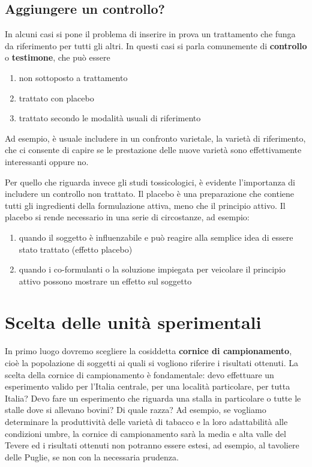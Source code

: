 \documentclass[a4paper,12pt,oneside]{book}
\providecommand{\tightlist}{%
  \setlength{\itemsep}{0pt}\setlength{\parskip}{0pt}}
\begin{document}
\hypertarget{aggiungere-un-controllo}{%
\subsection{Aggiungere un controllo?}\label{aggiungere-un-controllo}}

In alcuni casi si pone il problema di inserire in prova un trattamento che funga da riferimento per tutti gli altri. In questi casi si parla comunemente di \textbf{controllo} o \textbf{testimone}, che può essere

\begin{enumerate}
\def\labelenumi{\arabic{enumi}.}
\tightlist
\item
  non sottoposto a trattamento
\item
  trattato con placebo
\item
  trattato secondo le modalità usuali di riferimento
\end{enumerate}

Ad esempio, è usuale includere in un confronto varietale, la varietà di riferimento, che ci consente di capire se le prestazione delle nuove varietà sono effettivamente interessanti oppure no.

Per quello che riguarda invece gli studi tossicologici, è evidente l'importanza di includere un controllo non trattato. Il placebo è una preparazione che contiene tutti gli ingredienti della formulazione attiva, meno che il principio attivo. Il placebo si rende necessario in una serie di circostanze, ad esempio:

\begin{enumerate}
\def\labelenumi{\arabic{enumi}.}
\tightlist
\item
  quando il soggetto è influenzabile e può reagire alla semplice idea di essere stato trattato (effetto placebo)
\item
  quando i co-formulanti o la soluzione impiegata per veicolare il principio attivo possono mostrare un effetto sul soggetto
\end{enumerate}

\hypertarget{scelta-delle-unita-sperimentali}{%
\section{Scelta delle unità sperimentali}\label{scelta-delle-unita-sperimentali}}

In primo luogo dovremo scegliere la cosiddetta \textbf{cornice di campionamento}, cioè la popolazione di soggetti ai quali si vogliono riferire i risultati ottenuti. La scelta della cornice di campionamento è fondamentale: devo effettuare un esperimento valido per l'Italia centrale, per una località particolare, per tutta Italia? Devo fare un esperimento che riguarda una stalla in particolare o tutte le stalle dove si allevano bovini? Di quale razza? Ad esempio, se vogliamo determinare la produttività delle varietà di tabacco e la loro adattabilità alle condizioni umbre, la cornice di campionamento sarà la media e alta valle del Tevere ed i risultati ottenuti non potranno essere estesi, ad esempio, al tavoliere delle Puglie, se non con la necessaria prudenza.
\end{document}
